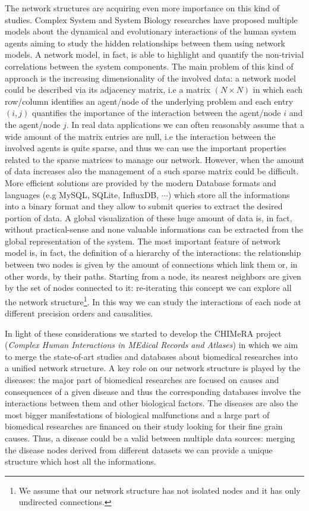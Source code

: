 \documentclass{standalone}
\begin{document}
The network structures are acquiring even more importance on this kind of studies.
Complex System and System Biology researches have proposed multiple models about the dynamical and evolutionary interactions of the human system agents aiming to study the hidden relationships between them using network models.
A network model, in fact, is able to highlight and quantify the non-trivial correlations between the system components.
The main problem of this kind of approach is the increasing dimensionality of the involved data: a network model could be described via its adjacency matrix, i.e a matrix $(N\times N)$ in which each row/column identifies an agent/node of the underlying problem and each entry $(i, j)$ quantifies the importance of the interaction between the agent/node $i$ and the agent/node $j$.
In real data applications we can often reasonably assume that a wide amount of the matrix entries are null, i.e the interaction between the involved agents is quite sparse, and thus we can use the important properties related to the sparse matrices to manage our network.
However, when the amount of data increases also the management of a such sparse matrix could be difficult.
More efficient solutions are provided by the modern Database formats and languages (e.g \textsf{MySQL}, \textsf{SQLite}, \textsf{InfluxDB}, $\cdots$) which store all the informations into a binary format and they allow to submit queries to extract the desired portion of data.
A global visualization of these huge amount of data is, in fact, without practical-sense and none valuable informations can be extracted from the global representation of the system.
The most important feature of network model is, in fact, the definition of a hierarchy of the interactions: the relationship between two nodes is given by the amount of connections which link them or, in other words, by their paths.
Starting from a node, its nearest neighbors are given by the set of nodes connected to it: re-iterating this concept we can explore all the network structure\footnote{
  We assume that our network structure has not isolated nodes and it has only undirected connections.
}.
In this way we can study the interactions of each node at different precision orders and causalities.

In light of these considerations we started to develop the \textsf{CHIMeRA} project (\emph{Complex Human Interactions in MEdical Records and Atlases}) in which we aim to merge the state-of-art studies and databases about biomedical researches into a unified network structure.
A key role on our network structure is played by the diseases: the major part of biomedical researches are focused on causes and consequences of a given disease and thus the corresponding databases involve the interactions between them and other biological factors.
The diseases are also the most bigger manifestations of biological malfunctions and a large part of biomedical researches are financed on their study looking for their fine grain causes.
Thus, a disease could be a valid  between multiple data sources: merging the disease nodes derived from different datasets we can provide a unique structure which host all the informations.
\end{document}

